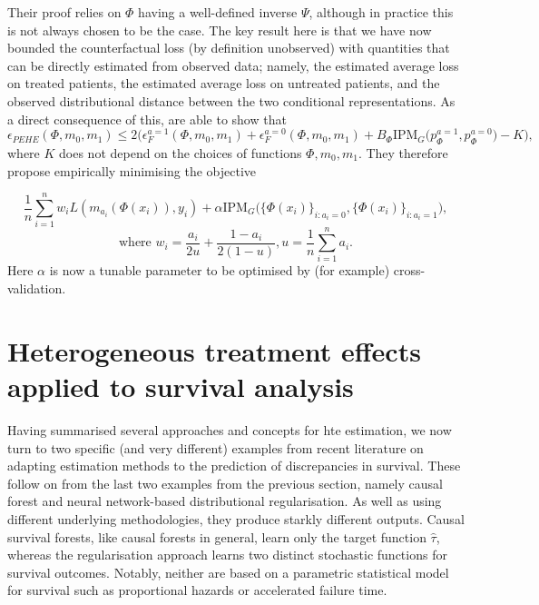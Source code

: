 \documentclass[../thesis.tex]{subfiles}
\begin{document}
Their proof relies on $\Phi$ having a well-defined inverse $\Psi$, although in practice this is not always chosen to be the case. The key result here is that we have now bounded the counterfactual loss (by definition unobserved) with quantities that can be directly estimated from observed data; namely, the estimated average loss on treated patients, the estimated average loss on untreated patients, and the observed distributional distance between the two conditional representations. As a direct consequence of this, \citet{shalit_estimating_2017} are able to show that 
\[ \epsilon_{PEHE}(\Phi, m_0, m_1) \leq 2\Big(\epsilon_{F}^{a=1}(\Phi, m_0, m_1) + \epsilon^{a=0}_F(\Phi, m_0, m_1) + B_{\Phi}\mathrm{IPM}_G\big(p_\Phi^{a=1}, p_\Phi^{a=0}\big) - K\Big),\]
where $K$ does not depend on the choices of functions $\Phi, m_0, m_1$. They therefore propose empirically minimising the objective

\[\frac{1}{n}\sum_{i=1}^n w_i L(m_{a_i}(\Phi(x_i)), y_i) + \alpha \mathrm{IPM}_G\big(\{\Phi(x_i)\}_{i:a_i=0}, \{\Phi(x_i)\}_{i:a_i=1}\big),\]
\[ \text{where } w_i = \frac{a_i}{2u} + \frac{1-a_i}{2(1-u)}, u = \frac{1}{n}\sum_{i=1}^{n}a_i.\]
Here $\alpha$ is now a tunable parameter to be optimised by (for example) cross-validation.


\section{Heterogeneous treatment effects applied to survival analysis \label{sec:hte_survival}}
Having summarised several approaches and concepts for \gls{hte} estimation, we now turn to two specific (and very different) examples from recent literature on adapting estimation methods to the prediction of discrepancies in survival. These follow on from the last two examples from the previous section, namely causal forest and neural network-based distributional regularisation. As well as using different underlying methodologies, they produce starkly different outputs. Causal survival forests, like causal forests in general, learn only the target function $\hat{\tau}$, whereas the regularisation approach learns two distinct stochastic functions for survival outcomes. Notably, neither are based on a parametric statistical model for survival such as proportional hazards or accelerated failure time.
\end{document}
